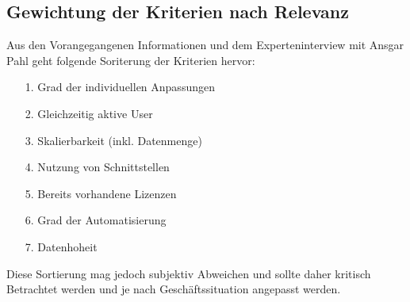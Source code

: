 \documentclass[12pt,bibtotoc]{article}
\begin{document}
		\subsection{Gewichtung der Kriterien nach Relevanz}
		Aus den Vorangegangenen Informationen und dem Experteninterview mit Ansgar Pahl \cite{Anhang} geht folgende Soriterung der Kriterien hervor:
		\begin{itemize}
			\item[1.] Grad der individuellen Anpassungen
			\item[2.] Gleichzeitig aktive User
			\item[3.] Skalierbarkeit (inkl. Datenmenge)
			\item[4.] Nutzung von Schnittstellen
			\item[5.] Bereits vorhandene Lizenzen
			\item[6.] Grad der Automatisierung
			\item[7.] Datenhoheit 
		\end{itemize}
		Diese Sortierung mag jedoch subjektiv Abweichen und sollte daher kritisch Betrachtet werden und je nach Geschäftssituation angepasst werden.
		\newpage
\end{document}
